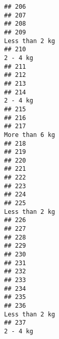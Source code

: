 \documentclass[
]{article}
\begin{document}
\begin{verbatim}
## 206                                                                            
## 207                                                                            
## 208                                                                            
## 209                                                              Less than 2 kg
## 210                                                                    2 - 4 kg
## 211                                                                            
## 212                                                                            
## 213                                                                            
## 214                                                                    2 - 4 kg
## 215                                                                            
## 216                                                                            
## 217                                                              More than 6 kg
## 218                                                                            
## 219                                                                            
## 220                                                                            
## 221                                                                            
## 222                                                                            
## 223                                                                            
## 224                                                                            
## 225                                                              Less than 2 kg
## 226                                                                            
## 227                                                                            
## 228                                                                            
## 229                                                                            
## 230                                                                            
## 231                                                                            
## 232                                                                            
## 233                                                                            
## 234                                                                            
## 235                                                                            
## 236                                                              Less than 2 kg
## 237                                                                    2 - 4 kg

\end{verbatim}
\end{document}
